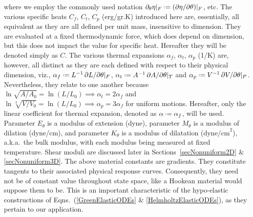 where we employ the commonly used notation $\partial_{\theta} \eta |_F \defeq ( \partial \eta / \partial \theta ) |_F$, etc.  The various specific heats $C_f$, $C_t$, $C_p$ (erg/gr.K) introduced here are, essentially, all equivalent as they are all defined per unit mass, insensitive to dimension.  They are evaluated at a fixed thermo\-dynamic force, which does depend on dimension, but this does not impact the value for specific heat.  Hereafter they will be denoted simply as $C$.  The various thermal expansions $\alpha_f$, $\alpha_t$, $\alpha_p$ (1/K) are, however, all distinct as they are each defined with respect to their physical dimension, viz., $\alpha_f \defeq L^{-1} \, \partial L / \partial \theta |_F$, $\alpha_t \defeq A^{-1} \, \partial A / \partial \theta |_T$ and $\alpha_p \defeq V^{-1} \, \partial V / \partial \theta |_P$.  Nevertheless, they relate to one another because $\ln \sqrt{A / \! A_0} = \ln (L / L_0) \implies \alpha_t = 2 \alpha_f$ and $\ln \sqrt[3]{V \! / V_0} = \ln (L / L_0) \implies \alpha_p = 3 \alpha_f$ for uniform motions.  Hereafter, only the linear coefficient for thermal expansion, denoted as $\alpha \defeq \alpha_f$, will be used.  Parameter $E_{\theta}$ is a modulus of extension (dyne), parameter $M_{\theta}$ is a modulus of dilation (dyne/cm), and parameter $K_{\theta}$ is a modulus of dilatation ($\mathrm{dyne/cm}^2$), a.k.a.\ the bulk modulus, with each modulus being measured at fixed temperature.  Shear moduli are discussed later in Sections~\ref{secNonuniform2D} \& \ref{secNonuniform3D}.  The above material constants are gradients.  They constitute tangents to their associated physical response curves.  Consequently, they need not be of constant value throughout state space, like a Hookean material would suppose them to be.  This is an important characteristic of the hypo-elastic constructions of Eqns.~(\ref{GreenElasticODEs} \& \ref{HelmholtzElasticODEs}), as they pertain to our application. 

